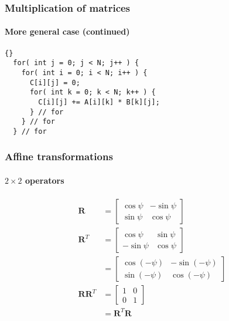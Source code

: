 \documentclass[xcolor=dvipsnames]{beamer}
\begin{document}
\begin{frame}[fragile]
\frametitle{Multiplication of matrices}
\framesubtitle{More general case (continued)}

  \begin{lstlisting}{}
  for( int j = 0; j < N; j++ ) {
    for( int i = 0; i < N; i++ ) {
      C[i][j] = 0;
      for( int k = 0; k < N; k++ ) {
        C[i][j] += A[i][k] * B[k][j];
      } // for
    } // for
  } // for
    \end{lstlisting}

\end{frame}

\begin{frame}
\frametitle{Affine transformations}
\framesubtitle{$2 \times 2$ operators}

  \begin{align*}
    \mathbf{R} & =
    \left[ \begin{array}{rr}
      \cos \psi & -\sin \psi \\
      \sin \psi & \cos \psi
      \end{array} \right] \\
    \mathbf{R}^T & =
    \left[ \begin{array}{rr}
      \cos \psi & \sin \psi \\
      -\sin \psi & \cos \psi
      \end{array} \right] \\
    & =
    \left[ \begin{array}{rr}
      \cos (-\psi) & -\sin (-\psi) \\
      \sin (-\psi) & \cos (-\psi)
      \end{array} \right] \\
    \mathbf{R}\mathbf{R}^T & =
    \left[ \begin{array}{rr}
      1 & 0 \\
      0 & 1 
      \end{array} \right] \\
    & = \mathbf{R}^T \mathbf{R}
    \end{align*}

  \end{frame}
\end{document}
